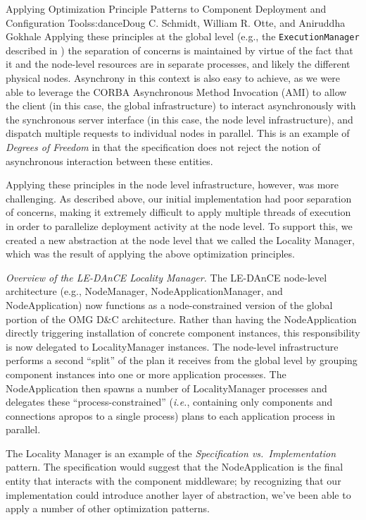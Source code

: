 \begin{aosachapter}{Applying Optimization Principle Patterns to Component Deployment and
                    Configuration Tools}{s:dance}{Doug C. Schmidt, William R. Otte, and Aniruddha Gokhale}
Applying these principles at the global level (e.g., the
\texttt{ExecutionManager} described in )
the separation of concerns is maintained by virtue of the fact that it
and the node-level resources are in separate processes, and likely the
different physical nodes. Asynchrony in this context is also easy to
achieve, as we were able to leverage the CORBA Asynchronous Method
Invocation (AMI) to allow the client (in this case, the global
infrastructure) to interact asynchronously with the synchronous server
interface (in this case, the node level infrastructure), and dispatch
multiple requests to individual nodes in parallel. This is an example of
\emph{Degrees of Freedom} in that the specification does not reject the
notion of asynchronous interaction between these entities.

Applying these principles in the node level infrastructure, however, was
more challenging. As described above, our initial implementation had
poor separation of concerns, making it extremely difficult to apply
multiple threads of execution in order to parallelize deployment
activity at the node level. To support this, we created a new
abstraction at the node level that we called the Locality Manager, which
was the result of applying the above optimization principles.

\emph{Overview of the LE-DAnCE Locality Manager.} The LE-DAnCE
node-level architecture (e.g., NodeManager, NodeApplicationManager, and
NodeApplication) now functions as a node-constrained version of the
global portion of the OMG D\&C architecture. Rather than having the
NodeApplication directly triggering installation of concrete component
instances, this responsibility is now delegated to LocalityManager
instances. The node-level infrastructure performs a second ``split'' of
the plan it receives from the global level by grouping component
instances into one or more application processes. The NodeApplication
then spawns a number of LocalityManager processes and delegates these
``process-constrained'' (\emph{i.e.}, containing only components and
connections apropos to a single process) plans to each application
process in parallel.

The Locality Manager is an example of the \emph{Specification
vs.~Implementation} pattern. The specification would suggest that the
NodeApplication is the final entity that interacts with the component
middleware; by recognizing that our implementation could introduce
another layer of abstraction, we've been able to apply a number of other
optimization patterns.


\end{aosachapter}
